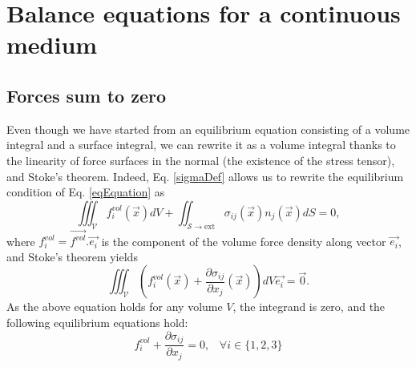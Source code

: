 \documentclass[DIV=12]{article}
\newcommand{\vol}{\mathcal{V}}
\newcommand{\sExt}{{{\mathcal{S}}\rightarrow{\mathrm{ext}}}}
\newcommand{\intVol}{\iiint}
\newcommand{\fVol}{\overrightarrow{f^{vol}}}
\begin{document}
\section{Balance equations for a continuous medium}

\subsection{Forces sum to zero}
 Even though we have started from an equilibrium equation consisting 
 of a volume integral and a surface integral, we can rewrite it as 
 a volume integral thanks to the linearity of force surfaces in the normal (the existence of the stress tensor),
 and Stoke's theorem. Indeed, Eq. \ref{sigmaDef} allows us to rewrite the equilibrium condition of Eq. \ref{eqEquation}
 as 
 \begin{equation}
 \intVol_{\vol}   f^{vol}_i( \vec{x})  dV +  \iint_\sExt \sigma_{ij}( \vec{x} ) n_j( \vec{x}) dS =  0,
\end{equation}
 where $f^{vol}_i = \fVol . \vec{e_i}$ is the component of the volume force density 
 along vector $\vec{e_i}$, and Stoke's theorem yields 
\begin{equation}
 \intVol_{\vol} \left( f^{vol}_i ( \vec{x})  + \frac{\partial \sigma_{ij}}{\partial{ x_j}}( \vec{x})\right) dV \vec{e_i}=  \vec{0}.
\end{equation}
As the above equation holds for any volume $V$, the integrand is zero,
 and the following equilibrium equations hold:
 \begin{equation}
  \boxed{f^{vol}_i +\frac{\partial \sigma_{ij}}{\partial{ x_j}} = 0, \;\;\;\forall i\in \{1,2,3\}}
\label{volEquation}
 \end{equation}
\end{document}
